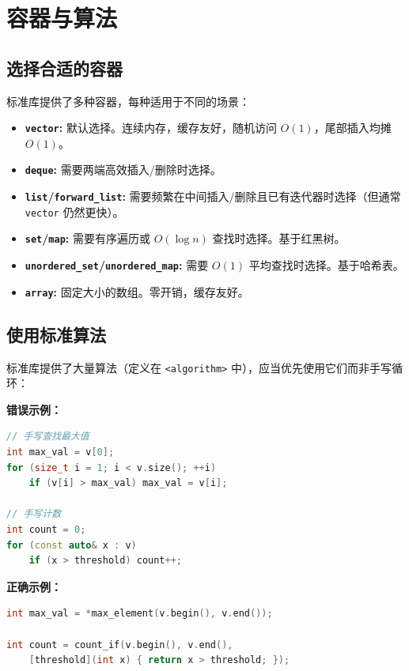 \section{容器与算法}

\subsection*{选择合适的容器}

标准库提供了多种容器，每种适用于不同的场景：

\begin{itemize}
\item \textbf{\texttt{vector}:} 默认选择。连续内存，缓存友好，随机访问 $O(1)$，尾部插入均摊 $O(1)$。
\item \textbf{\texttt{deque}:} 需要两端高效插入/删除时选择。
\item \textbf{\texttt{list}/\allowbreak{}\texttt{forward\_list}:} 需要频繁在中间插入/删除且已有迭代器时选择（但通常 \texttt{vector} 仍然更快）。
\item \textbf{\texttt{set}/\allowbreak{}\texttt{map}:} 需要有序遍历或 $O(\log n)$ 查找时选择。基于红黑树。
\item \textbf{\texttt{unordered\_set}/\allowbreak{}\texttt{unordered\_map}:} 需要 $O(1)$ 平均查找时选择。基于哈希表。
\item \textbf{\texttt{array}:} 固定大小的数组。零开销，缓存友好。
\end{itemize}

\subsection*{使用标准算法}

标准库提供了大量算法（定义在 \texttt{<algorithm>} 中），应当优先使用它们而非手写循环：

\textbf{错误示例：}

\begin{lstlisting}[language=C++]
// 手写查找最大值
int max_val = v[0];
for (size_t i = 1; i < v.size(); ++i)
    if (v[i] > max_val) max_val = v[i];

// 手写计数
int count = 0;
for (const auto& x : v)
    if (x > threshold) count++;
\end{lstlisting}

\textbf{正确示例：}

\begin{lstlisting}[language=C++]
int max_val = *max_element(v.begin(), v.end());

int count = count_if(v.begin(), v.end(),
    [threshold](int x) { return x > threshold; });
\end{lstlisting}


